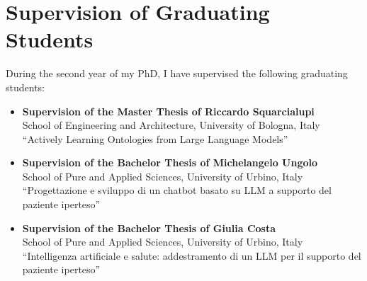 \documentclass[11pt]{article}
\begin{document}
\section{Supervision of Graduating Students}\label{sec:supervision-of-graduating-students}
%
During the second year of my PhD, I have supervised the following graduating students:
%
\begin{itemize}
	\item \textbf{Supervision of the Master Thesis of Riccardo Squarcialupi}
	\\School of Engineering and Architecture, University of Bologna, Italy
	\\``Actively Learning Ontologies from Large Language Models''
	\item \textbf{Supervision of the Bachelor Thesis of Michelangelo Ungolo}
	\\School of Pure and Applied Sciences, University of Urbino, Italy
	\\``Progettazione e sviluppo di un chatbot basato su LLM a supporto del paziente iperteso''
	\item \textbf{Supervision of the Bachelor Thesis of Giulia Costa}
	\\School of Pure and Applied Sciences, University of Urbino, Italy
	\\``Intelligenza artificiale e salute: addestramento di un LLM per il supporto del paziente iperteso''
\end{itemize}
\end{document}

